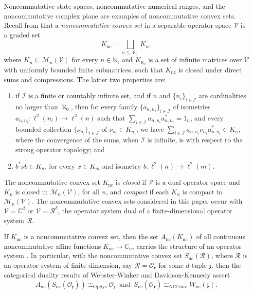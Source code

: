 \documentclass{amsart}
\theoremstyle{definition}
\theoremstyle{remark}
\newcommand{\M}{\mathcal{M}}
\newcommand\osr{{\mathcal R}}
\numberwithin{equation}{section}
\begin{document}
Noncommutative state spaces, noncommutative numerical ranges, and the noncommutative complex plane
are examples of 
noncommutative convex sets. 
Recall from \cite{davidson--kennedy2019} 
that a \emph{noncommutative convex set} in a separable operator space $\mathcal V$
is a graded set
\[
K_{\textrm{nc}} = \bigsqcup_{n\leq\aleph_0} K_n,
\]
where $K_n\subseteq \M_n(\mathcal V)$ for every $n\in\mathbb N$, and $K_{\aleph_0}$ is a 
set of infinite matrices over $\mathcal V$ with uniformly bounded
finite submatrices, such that $K_{\textrm{nc}}$ is closed under direct sums and compressions. The latter two properties are:
\begin{enumerate}
\item if $\mathcal I$ is a finite or countably infinite set, and if $n$ and $\{n_i\}_{i\in\mathcal I}$ are cardinalities no larger than $\aleph_0$,
then for every family $\{a_{n,n_i}\}_{i\in \mathcal I}$ of isometries $a_{n,n_i}:\ell^2(n_i)\rightarrow\ell^2(n)$
such that $\sum_{i\in\mathcal I}a_{n,n_i}a_{n,n_i}^*=1_n$, and every bounded collection $\{\nu_{n_i}\}_{i\in\mathcal I}$ of 
$\nu_{n_i}\in K_{n_i}$, we have $\sum_{i\in\mathcal I}a_{n,n_i}\nu_{n_i}a_{n,n_i}^* \in K_n$, where the convergence of the sums,
when $\mathcal I$ is infinite, is with respect to the strong operator topology; and
\item $b^* \nu b\in K_n$, for every $x\in K_m$ and isometry $b:\ell^2(n)\rightarrow\ell^2(m)$.
\end{enumerate}
The noncommutative convex set $K_{\textrm{nc}}$ is \emph{closed} if $\mathcal V$ is a dual operator space and $K_n$ is closed in $\M_n(\mathcal V)$, for all $n$,
and \emph{compact} if each $K_n$ is compact in $\M_n(\mathcal V)$. The noncommutative convex sets considered in this paper occur with $\mathcal V=\mathbb C^d$
or $\mathcal V=\osr^\delta$, the operator system dual of a finite-dimensional operator system $\osr$.

If $K_{\textrm{nc}}$ is a noncommutative convex set, then the
set $A_{\textrm{nc}}( K_{\textrm{nc}})$ of all continuous noncommutative 
affine functions $K_{\textrm{nc}}\rightarrow\mathbb C_{\textrm{nc}}$
carries the structure of an operator system \cite[Sections 2.5 \& 3.2]{davidson--kennedy2019}.
In particular, with the noncommutative convex set $S_{\textrm{nc}}(\osr)$, where $\osr$ is an operator system of finite dimension, 
say $\osr=\mathcal O_{\mathfrak x}$ for some $d$-tuple $\mathfrak x$, then
the categorical duality results of Webster-Winker \cite{webster--winkler1999} and Davidson-Kennedy \cite{davidson--kennedy2019} assert
\begin{equation}\label{e:cd}
A_{\textrm{nc}}\left( S_{\textrm{nc}}(\mathcal O_{\mathfrak x})\right) \cong_{{\textrm{OpSys}}} \mathcal O_{\mathfrak x} \,\mbox{ and }\,
S_{\textrm{nc}}(\mathcal O_{\mathfrak x}) \cong_{{\textrm{NCConv}}} 
W_{\textrm{nc}}(\mathfrak x).
\end{equation}
\end{document}
